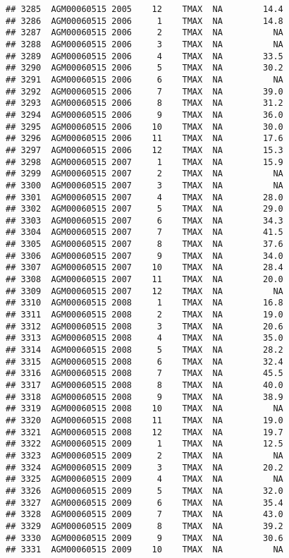 \documentclass{article}\usepackage[]{graphicx}\usepackage[]{color}
\makeatletter
\newenvironment{kframe}{%
 \def\at@end@of@kframe{}%
 \ifinner\ifhmode%
  \def\at@end@of@kframe{\end{minipage}}%
  \begin{minipage}{\columnwidth}%
 \fi\fi%
 \def\FrameCommand##1{\hskip\@totalleftmargin \hskip-\fboxsep
 \colorbox{shadecolor}{##1}\hskip-\fboxsep
     \hskip-\linewidth \hskip-\@totalleftmargin \hskip\columnwidth}%
 \MakeFramed {\advance\hsize-\width
   \@totalleftmargin\z@ \linewidth\hsize
   \@setminipage}}%
 {\par\unskip\endMakeFramed%
 \at@end@of@kframe}
\newenvironment{knitrout}{}{} %
\makeatother
\begin{document}
\begin{knitrout}
\begin{kframe}
\begin{verbatim}
## 3285  AGM00060515 2005    12    TMAX  NA        14.4
## 3286  AGM00060515 2006     1    TMAX  NA        14.8
## 3287  AGM00060515 2006     2    TMAX  NA          NA
## 3288  AGM00060515 2006     3    TMAX  NA          NA
## 3289  AGM00060515 2006     4    TMAX  NA        33.5
## 3290  AGM00060515 2006     5    TMAX  NA        30.2
## 3291  AGM00060515 2006     6    TMAX  NA          NA
## 3292  AGM00060515 2006     7    TMAX  NA        39.0
## 3293  AGM00060515 2006     8    TMAX  NA        31.2
## 3294  AGM00060515 2006     9    TMAX  NA        36.0
## 3295  AGM00060515 2006    10    TMAX  NA        30.0
## 3296  AGM00060515 2006    11    TMAX  NA        17.6
## 3297  AGM00060515 2006    12    TMAX  NA        15.3
## 3298  AGM00060515 2007     1    TMAX  NA        15.9
## 3299  AGM00060515 2007     2    TMAX  NA          NA
## 3300  AGM00060515 2007     3    TMAX  NA          NA
## 3301  AGM00060515 2007     4    TMAX  NA        28.0
## 3302  AGM00060515 2007     5    TMAX  NA        29.0
## 3303  AGM00060515 2007     6    TMAX  NA        34.3
## 3304  AGM00060515 2007     7    TMAX  NA        41.5
## 3305  AGM00060515 2007     8    TMAX  NA        37.6
## 3306  AGM00060515 2007     9    TMAX  NA        34.0
## 3307  AGM00060515 2007    10    TMAX  NA        28.4
## 3308  AGM00060515 2007    11    TMAX  NA        20.0
## 3309  AGM00060515 2007    12    TMAX  NA          NA
## 3310  AGM00060515 2008     1    TMAX  NA        16.8
## 3311  AGM00060515 2008     2    TMAX  NA        19.0
## 3312  AGM00060515 2008     3    TMAX  NA        20.6
## 3313  AGM00060515 2008     4    TMAX  NA        35.0
## 3314  AGM00060515 2008     5    TMAX  NA        28.2
## 3315  AGM00060515 2008     6    TMAX  NA        32.4
## 3316  AGM00060515 2008     7    TMAX  NA        45.5
## 3317  AGM00060515 2008     8    TMAX  NA        40.0
## 3318  AGM00060515 2008     9    TMAX  NA        38.9
## 3319  AGM00060515 2008    10    TMAX  NA          NA
## 3320  AGM00060515 2008    11    TMAX  NA        19.0
## 3321  AGM00060515 2008    12    TMAX  NA        19.7
## 3322  AGM00060515 2009     1    TMAX  NA        12.5
## 3323  AGM00060515 2009     2    TMAX  NA          NA
## 3324  AGM00060515 2009     3    TMAX  NA        20.2
## 3325  AGM00060515 2009     4    TMAX  NA          NA
## 3326  AGM00060515 2009     5    TMAX  NA        32.0
## 3327  AGM00060515 2009     6    TMAX  NA        35.4
## 3328  AGM00060515 2009     7    TMAX  NA        43.0
## 3329  AGM00060515 2009     8    TMAX  NA        39.2
## 3330  AGM00060515 2009     9    TMAX  NA        30.6
## 3331  AGM00060515 2009    10    TMAX  NA          NA

\end{verbatim}
\end{kframe}
\end{knitrout}
\end{document}
